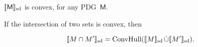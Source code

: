 \documentclass{article}
\newcommand\SD{_{\text{sd}}}
\newcommand{\sfM}{\mathsf M}
\newcommand{\MN}{PDG}
\numberwithin{equation}{section}
\begin{document}
	\begin{lemma}[restate=thmsetconvex] 
		\label{prop:convex}
		$\bbr{\sfM}\SD$ is convex, for any \MN\ $\sfM$.
	\end{lemma}%

	\begin{vfull}
	If the intersection of two sets is convex, then 
	\begin{conj}\label{prop:intersect-set-semantics}
		$$\bbr{M \cap M'}\SD = \text{ConvHull}(\bbr{M}\SD \mathop{\dot\cup} \bbr{M'}\SD).$$
	\end{conj}
	\end{vfull}
	






\end{document}
